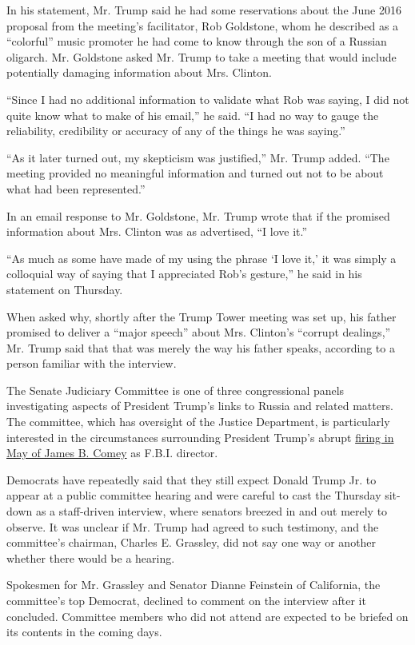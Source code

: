 In his statement, Mr. Trump said he had some reservations about the June
2016 proposal from the meeting's facilitator, Rob Goldstone, whom he
described as a ``colorful'' music promoter he had come to know through
the son of a Russian oligarch. Mr. Goldstone asked Mr. Trump to take a
meeting that would include potentially damaging information about Mrs.
Clinton.

``Since I had no additional information to validate what Rob was saying,
I did not quite know what to make of his email,'' he said. ``I had no
way to gauge the reliability, credibility or accuracy of any of the
things he was saying.''

``As it later turned out, my skepticism was justified,'' Mr. Trump
added. ``The meeting provided no meaningful information and turned out
not to be about what had been represented.''

In an email response to Mr. Goldstone, Mr. Trump wrote that if the
promised information about Mrs. Clinton was as advertised, ``I love
it.''

``As much as some have made of my using the phrase `I love it,' it was
simply a colloquial way of saying that I appreciated Rob's gesture,'' he
said in his statement on Thursday.

When asked why, shortly after the Trump Tower meeting was set up, his
father promised to deliver a ``major speech'' about Mrs. Clinton's
``corrupt dealings,'' Mr. Trump said that that was merely the way his
father speaks, according to a person familiar with the interview.

The Senate Judiciary Committee is one of three congressional panels
investigating aspects of President Trump's links to Russia and related
matters. The committee, which has oversight of the Justice Department,
is particularly interested in the circumstances surrounding President
Trump's abrupt
\href{https://www.nytimes3xbfgragh.onion/2017/05/09/us/politics/james-comey-fired-fbi.html?_r=0}{firing
in May of James B. Comey} as F.B.I. director.

Democrats have repeatedly said that they still expect Donald Trump Jr.
to appear at a public committee hearing and were careful to cast the
Thursday sit-down as a staff-driven interview, where senators breezed in
and out merely to observe. It was unclear if Mr. Trump had agreed to
such testimony, and the committee's chairman, Charles E. Grassley, did
not say one way or another whether there would be a hearing.

Spokesmen for Mr. Grassley and Senator Dianne Feinstein of California,
the committee's top Democrat, declined to comment on the interview after
it concluded. Committee members who did not attend are expected to be
briefed on its contents in the coming days.

